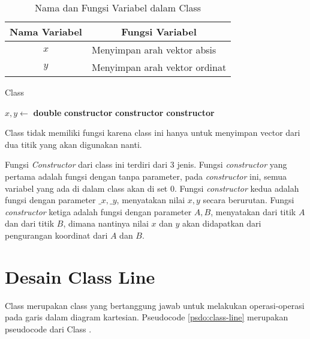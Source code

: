 \begin{table}[]
	\Centering
	\begin{tabular}{|c|p{7cm}|}
	\hline
	Nama Variabel & \multicolumn{1}{c|}{Fungsi Variabel}                               \\ \hline
$x$           & Menyimpan arah vektor absis  \\ \hline
$y$           & Menyimpan arah vektor ordinat          \\ \hline
	\end{tabular}
	\caption{Nama dan Fungsi Variabel dalam Class }
	\label{tab:var-vec}
\end{table}
\begin{algorithm}
	\caption{Class }
	\label{psdo:class-vec}
	\begin{algorithmic}[1]
        \State $ x, y \leftarrow $ \textbf{double}
		\State \textbf{constructor} 
        \State \textbf{constructor} 
        \State \textbf{constructor} 
	\end{algorithmic}
\end{algorithm}

Class  tidak memiliki fungsi karena class ini hanya untuk menyimpan vector dari dua titik yang akan digunakan nanti.

Fungsi \textit{Constructor} dari class ini terdiri dari 3 jenis. Fungsi \textit{constructor} yang pertama adalah fungsi dengan tanpa parameter, pada \textit{constructor} ini, semua variabel yang ada di dalam class  akan di set $0$. Fungsi \textit{constructor} kedua adalah fungsi dengan parameter $\_x, \_y$, menyatakan nilai $x, y$ secara berurutan. Fungsi \textit{constructor} ketiga adalah fungsi dengan parameter $A, B$, menyatakan  dari titik $A$ dan  dari titik $B$, dimana nantinya nilai $x$ dan $y$ akan didapatkan dari pengurangan koordinat dari  $A$ dan  $B$.

\section{Desain Class Line}
\label{sec:line}
Class  merupakan class yang bertanggung jawab untuk melakukan operasi-operasi pada garis dalam diagram kartesian. Pseudocode \ref{psdo:class-line} merupakan pseudocode dari Class . 

